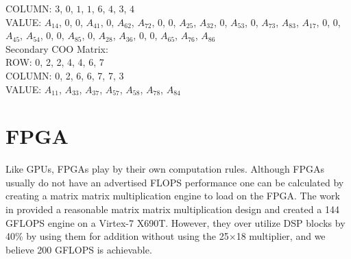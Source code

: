 COLUMN: $3$, $0$, $1$, $1$, $6$, $4$, $3$, $4$ \\
VALUE: $A_{14}$, $0$, $0$, $A_{41}$, $0$, $A_{62}$, $A_{72}$, $0$, $0$, $A_{25}$, $A_{32}$, $0$, $A_{53}$, $0$, $A_{73}$, $A_{83}$, $A_{17}$, $0$, $0$, $A_{45}$, $A_{54}$, $0$, $0$, $A_{85}$, $0$, $A_{28}$, $A_{36}$, $0$, $0$, $A_{65}$, $A_{76}$, $A_{86}$ \\
Secondary COO Matrix:\\
ROW: 0, 2, 2, 4, 4, 6, 7\\
COLUMN: 0, 2, 6, 6, 7, 7, 3\\
VALUE: $A_{11}$, $A_{33}$, $A_{37}$, $A_{57}$, $A_{58}$, $A_{78}$, $A_{84}$\par
\section{FPGA} 
Like GPUs, FPGAs play by their own computation rules. Although FPGAs usually do not have an advertised FLOPS performance one can be calculated by creating a matrix matrix multiplication engine to load on the FPGA. The work in \cite{prelim:cappello} provided a reasonable matrix matrix multiplication design and created a 144 GFLOPS engine on a Virtex-7 X690T. However, they over utilize DSP blocks by 40\% by using them for addition without using the 25$\times$18 multiplier, and we believe 200 GFLOPS is achievable. \par 
